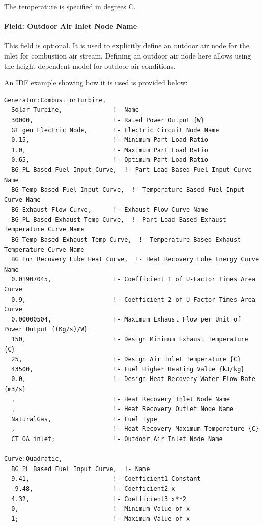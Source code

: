 The temperature is specified in degrees C.

\paragraph{Field: Outdoor Air Inlet Node Name}\label{field-outdoor-air-inlet-node-name-001}

This field is optional. It is used to explicitly define an outdoor air node for the inlet for combustion air stream. Defining an outdoor air node here allows using the height-dependent model for outdoor air conditions.

An IDF example showing how it is used is provided below:

\begin{lstlisting}
Generator:CombustionTurbine,
  Solar Turbine,              !- Name
  30000,                      !- Rated Power Output {W}
  GT gen Electric Node,       !- Electric Circuit Node Name
  0.15,                       !- Minimum Part Load Ratio
  1.0,                        !- Maximum Part Load Ratio
  0.65,                       !- Optimum Part Load Ratio
  BG PL Based Fuel Input Curve,  !- Part Load Based Fuel Input Curve Name
  BG Temp Based Fuel Input Curve,  !- Temperature Based Fuel Input Curve Name
  BG Exhaust Flow Curve,      !- Exhaust Flow Curve Name
  BG PL Based Exhaust Temp Curve,  !- Part Load Based Exhaust Temperature Curve Name
  BG Temp Based Exhaust Temp Curve,  !- Temperature Based Exhaust Temperature Curve Name
  BG Tur Recovery Lube Heat Curve,  !- Heat Recovery Lube Energy Curve Name
  0.01907045,                 !- Coefficient 1 of U-Factor Times Area Curve
  0.9,                        !- Coefficient 2 of U-Factor Times Area Curve
  0.00000504,                 !- Maximum Exhaust Flow per Unit of Power Output {(Kg/s)/W}
  150,                        !- Design Minimum Exhaust Temperature {C}
  25,                         !- Design Air Inlet Temperature {C}
  43500,                      !- Fuel Higher Heating Value {kJ/kg}
  0.0,                        !- Design Heat Recovery Water Flow Rate {m3/s}
  ,                           !- Heat Recovery Inlet Node Name
  ,                           !- Heat Recovery Outlet Node Name
  NaturalGas,                 !- Fuel Type
  ,                           !- Heat Recovery Maximum Temperature {C}
  CT OA inlet;                !- Outdoor Air Inlet Node Name

Curve:Quadratic,
  BG PL Based Fuel Input Curve,  !- Name
  9.41,                       !- Coefficient1 Constant
  -9.48,                      !- Coefficient2 x
  4.32,                       !- Coefficient3 x**2
  0,                          !- Minimum Value of x
  1;                          !- Maximum Value of x


\end{lstlisting}
